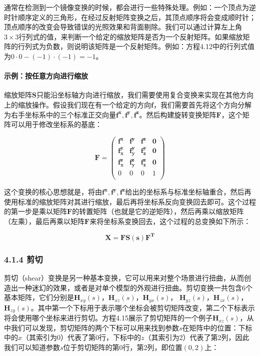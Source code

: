 \documentclass[
  paper=a4,
  ,captions=tableheading
]{scrartcl}
\begin{document}
通常在检测到一个镜像变换的时候，都会进行一些特殊处理。例如：一个顶点为逆时针顺序定义的三角形，在经过反射矩阵变换之后，其顶点顺序将会变成顺时针；顶点顺序的改变会导致错误的光照效果和背面剔除。我们可以通过计算左上角\(3 \times  3\)行列式的值，来判断一个给定的缩放矩阵是否为一个反射矩阵。如果缩放矩阵的行列式为负数，则说明该矩阵是一个反射矩阵。例如：方程4.12中的行列式值为\(0 \cdot 0 - (-1) \cdot (-1) = -1\)。

\paragraph{示例：按任意方向进行缩放}\label{ux793aux4f8bux6309ux4efbux610fux65b9ux5411ux8fdbux884cux7f29ux653e}

缩放矩阵\(\mathbf{S}\)只能沿坐标轴方向进行缩放，我们需要使用复合变换来实现在其他方向上的缩放操作。假设我们现在有一个给定的方向\(\mathbf{f}\)，我们需要首先将这个方向分解为右手坐标系中的三个标准正交向量\(\mathbf{f^x, f^y, f^z}\)。然后构建旋转变换矩阵\(\mathbf{F}\)，这个矩阵可以用于修改坐标系的基底：

\[
  \mathbf{F} =
  \left(
  \begin{array}{cccc}
      \mathbf{f^x}   & \mathbf{f^y}   & \mathbf{f^z}   & \mathbf{0} \\
      \mathbf{f^y_x} & \mathbf{f^y_y} & \mathbf{f^y_z} & \mathbf{0} \\
      \mathbf{f^z_x} & \mathbf{f^z_y} & \mathbf{f^z_z} & \mathbf{0} \\
      0              & 0              & 0              & 1          \\
    \end{array} \right)
  \tag{4.13}
\]

这个变换的核心思想就是，将由\(\mathbf{f^x, f^y, f^z}\)给出的坐标系与标准坐标轴重合，然后再使用标准的缩放矩阵对其进行缩放，最后再将坐标系反向变换回去即可。这个过程的第一步是乘以矩阵\(\mathbf{F}\)的转置矩阵（也就是它的逆矩阵），然后再乘以缩放矩阵（左乘），最后再乘以矩阵\(\mathbf{F}\)来将坐标系变换回去，这个过程的总变换如下所示：

\[
  \mathbf{X} = \mathbf{F} \mathbf{S(s)} \mathbf{F^T} \tag{4.14}
\]

\subsubsection{4.1.4 剪切}\label{ux526aux5207}

剪切（shear）变换是另一种基本变换，它可以用来对整个场景进行扭曲，从而创造出一种迷幻的效果，或者是对单个模型的外观进行扭曲。剪切变换一共包含6个基本矩阵，它们分别是\(\mathbf{H}_{xy}(s)\)，\(\mathbf{H}_{xz}(s)\)，\(\mathbf{H}_{yx}(s)\)，
\(\mathbf{H}_{yz}(s)\)，\(\mathbf{H}_{zx}(s)\)，\(\mathbf{H}_{zy}(s)\)。其中第一个下标用于表示哪个坐标会被剪切矩阵改变，第二个下标表示将会使用哪个坐标来进行剪切。方程4.15展示了剪切矩阵的一个例子\(\mathbf{H}_{xz}(s)\)，从中我们可以发现，剪切矩阵的两个下标可以用来找到参数\(s\)在矩阵中的位置：下标中的\(x\)（其索引为0）代表了第0行，下标中的\(z\)（其索引为2）代表了第2列，因此我们可以知道参数\(s\)位于剪切矩阵的第0行，第2列，即位置\((0,2)\)上：
\end{document}
